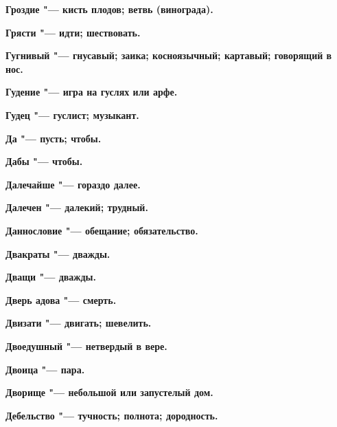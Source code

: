 \bfseries Гроздие \normalfont{} "--- кисть плодов; ветвь (винограда). 




\bfseries Грясти \normalfont{} "--- идти; шествовать. 




\bfseries Гугнивый \normalfont{} "--- гнусавый; заика; косноязычный; картавый; говорящий в нос. 




\bfseries Гудение \normalfont{} "--- игра на гуслях или арфе. 




\bfseries Гудец \normalfont{} "--- гуслист; музыкант. 




 





\bfseries Да \normalfont{} "--- пусть; чтобы. 




\bfseries Дабы \normalfont{} "--- чтобы. 




\bfseries Далечайше \normalfont{} "--- гораздо далее. 




\bfseries Далечен \normalfont{} "--- далекий; трудный. 




\bfseries Даннословие \normalfont{} "--- обещание; обязательство. 




\bfseries Двакраты \normalfont{} "--- дважды. 




\bfseries Дващи \normalfont{} "--- дважды. 




\bfseries Дверь адова \normalfont{} "--- смерть. 




\bfseries Двизати \normalfont{} "--- двигать; шевелить. 




\bfseries Двоедушный \normalfont{} "--- нетвердый в вере. 




\bfseries Двоица \normalfont{} "--- пара. 




\bfseries Дворище \normalfont{} "--- небольшой или запустелый дом. 




\bfseries Дебельство \normalfont{} "--- тучность; полнота; дородность. 




